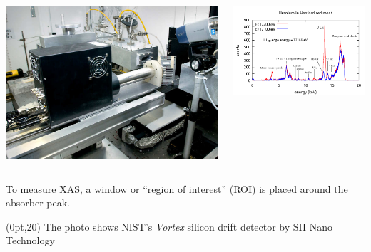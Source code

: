 \documentclass[10pt, xcolor=x11names, compress]{beamer}
\begin{document}
\begin{frame}
  \begin{columns}
    \begin{column}{0.5\linewidth}
      \includegraphics[width=\linewidth]{exp/vortex.jpg}
    \end{column}
    \begin{column}{0.5\linewidth}
      \includegraphics[width=\linewidth]{exp/xrf.png}
    \end{column}
  \end{columns}

  \medskip

  To measure XAS, a window or ``region of interest'' (ROI) is placed
  around the absorber peak.

  \begin{textblock*}{0.7\linewidth}(0pt,20\TPVertModule)%
    \tiny The photo shows NIST's \textit{Vortex} silicon drift
    detector by SII Nano Technology
  \end{textblock*}
\end{frame}
\end{document}
